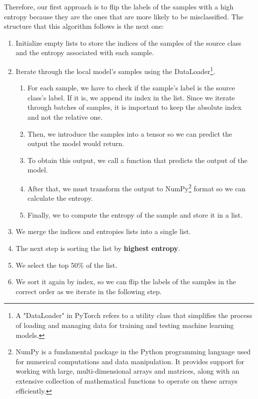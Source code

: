 Therefore, our first approach is to flip the labels of the samples with a high entropy because they are the ones that are more likely to be misclassified. The structure that this algorithm follows is the next one:%
\begin{enumerate}
        \item Initialize empty lists to store the indices of the samples of the source class and the entropy associated with each sample.
        \item Iterate through the local model's samples using the DataLoader\footnote{A "DataLoader" in PyTorch refers to a utility class that simplifies the process of loading and managing data for training and testing machine learning models.}.
                \begin{enumerate}
                        \item For each sample, we have to check if the sample's label is the source class's label. If it is, we append its index in the list. Since we iterate through batches of samples, it is important to keep the absolute index and not the relative one.
                        \item Then, we introduce the samples into a tensor so we can predict the output the model would return.
                        \item To obtain this output, we call a function that predicts the output of the model.%
                        \item After that, we must transform the output to NumPy\footnote{NumPy is a fundamental package in the Python programming language used for numerical computations and data manipulation. It provides support for working with large, multi-dimensional arrays and matrices, along with an extensive collection of mathematical functions to operate on these arrays efficiently.} format so we can calculate the entropy.
                        \item Finally, we to compute the entropy of the sample and store it in a list.
                \end{enumerate}
        \item We merge the indices and entropies lists into a single list.
        \item The next step is sorting the list by \textbf{highest entropy}.
        \item We select the top 50\% of the list.
        \item We sort it again by index, so we can flip the labels of the samples in the correct order as we iterate in the following step.

\end{enumerate}
